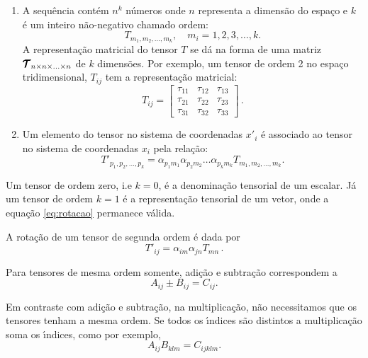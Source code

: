 \begin{enumerate}
  \item A sequ\^encia cont\'em $n^{k}$ n\'umeros onde $n$ representa a
dimens\~ao do espa\c{c}o e $k$ \'e um inteiro n\~ao-negativo
chamado ordem:
\begin{equation}
T_{m_{1},m_{2},...,m_{k}}, \quad m_{i}=1,2,3,\dots, k.
\end{equation}
    A representa\c{c}\~ao matricial do tensor $T$ se d\'a na forma de uma matriz
    $\pmb{\cal{T}}_{n\times n\times ...\times n}$ de $k$ dimens\~oes. Por exemplo, um tensor de
    ordem 2 no espa\c{c}o tridimensional, $T_{ij}$ tem a representa\c{c}\~ao matricial:
    \begin{equation}
      T_{ij} =
      \begin{bmatrix}
        \tau_{11} & \tau_{12} &\tau_{13} \\
        \tau_{21} & \tau_{22} &\tau_{23} \\
        \tau_{31} & \tau_{32} &\tau_{33} 
      \end{bmatrix}
      \, .
    \end{equation}

\item Um elemento do tensor no sistema de coordenadas $x'_{i}$ \'e
associado ao tensor no sistema de coordenadas $x_{i}$ pela
rela\c{c}\~ao:
\begin{equation}
T'_{p_{1},p_{2},\dots,p_{k}}=
\alpha_{p_{1}m_{1}}\alpha_{p_{2}m_{2}}\dots\alpha_{p_{k}m_{k}}T_{m_{1},m_{2},\dots,m_{k}}.
\end{equation}
\end{enumerate}


Um tensor de ordem zero, i.e $k=0$, \'e a denomina\c{c}\~ao tensorial de um
escalar. J\'a um tensor de ordem $k=1$ \'e a representa\c{c}\~ao tensorial de um
vetor, onde a equa\c{c}\~ao \ref{eq:rotacao} permanece v\'alida.

A rota\c{c}\~ao de um tensor de segunda ordem \'e dada por
\begin{equation}
T'_{ij}=\alpha_{im}\alpha_{jn}T_{mn} \, .
\end{equation}

Para tensores de mesma ordem somente, adi\c{c}\~ao e subtra\c{c}\~ao
correspondem a
\begin{equation}
A_{ij} \pm B_{ij}=C_{ij}.
\end{equation}


Em contraste com adi\c{c}\~ao e subtra\c{c}\~ao, na multiplica\c{c}\~ao, n\~ao
necessitamos que os tensores tenham a
mesma ordem. Se todos os \'\i ndices s\~ao distintos a
multiplica\c{c}\~ao soma os \'\i ndices, como por exemplo,
\begin{equation}
A_{ij}B_{klm}=C_{ijklm}.
\end{equation}


